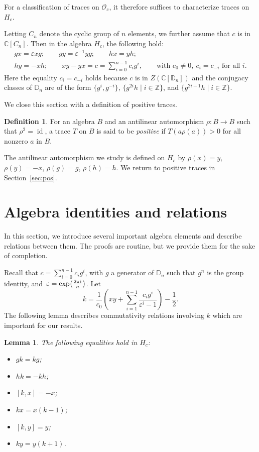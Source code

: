 \documentclass[pdftex]{sigma}
\newcommand\ZZ{\mathbb{Z}}
\newcommand\CC{\mathbb{C}}
\newcommand\DD{\mathbb{D}}
\newcommand\cO{\mathcal{O}}
\DeclareMathOperator\id{id}
\newcommand\rn{\frac{2\pi {\rm i}}{n}}
\newcommand\eps{\varepsilon}
\newcommand\half{\ensuremath{\frac{1}{2}}}
\numberwithin{equation}{section}
\newtheorem{Lemma}[Theorem]{Lemma}
\theoremstyle{definition}
\newtheorem{Definition}[Theorem]{Definition}
\begin{document}
For a classification of traces on $\cO_c$,
it therefore suffices to characterize traces on $H_c$.

Letting $C_n$ denote the cyclic group of $n$ elements,
we further assume that $c$ is in $\CC[C_n]$.
Then in the algebra $H_c$, the following hold:
\begin{gather*}
 gx = \eps xg; \qquad
 gy = \eps^{-1} yg; \qquad
 hx = yh; \\
 hy = -xh; \qquad
 xy - yx = c = \sum_{i = 0}^{n - 1} c_i g^i,\qquad
 \text{with $c_0 \neq 0$},\
 c_i = c_{-i} \text{ for all $i$}.
\end{gather*}
Here the equality $c_i = c_{-i}$ holds because
$c$ is in $Z(\CC[\DD_n])$
and the conjugacy classes of $\DD_n$ are of the form
$\big\{g^i, g^{-i}\big\}$, $\big\{ g^{2i} h \mid i \in \ZZ \big\}$,
and $\big\{ g^{2i + 1} h \mid i \in \ZZ \big\}$.

We close this section with a definition of positive traces.

\begin{Definition}
 For an algebra $B$ and an antilinear automorphism
 $\rho \colon B \to B$ such that $\rho^2 = \id$,
 a trace $T$ on $B$ is said to be \emph{positive} if
 $T(a \rho(a)) > 0$ for all nonzero $a$ in $B$.
\end{Definition}

The antilinear automorphism we study
is defined on $H_c$ by
$\rho(x) = y$, $\rho(y) = -x$, $\rho(g) = g$, $\rho(h) = h$.
We return to positive traces in Section~\ref{sec:pos}.


\section{Algebra identities and relations}
\label{sec:identities}

In this section, we introduce several important algebra elements
and describe relations between them.
The proofs are routine, but we provide them for the sake of completion.

Recall that $c = \sum_{i = 0}^{n - 1} c_i g^i$,
with $g$ a generator of $\DD_n$ such that $g^n$ is the group identity,
and~${\eps = \exp\bigl(\rn\bigr)}$.
Let
\begin{equation*}
 k = \frac1{c_0} \left( xy + \sum\limits_{i = 1}^{n - 1}
 \frac{c_i g^i}{\eps^i - 1} \right)
 - \half.
\end{equation*}
The following lemma describes commutativity relations
involving $k$
which are important for our results.

\begin{Lemma}
 \label{lem:k_prop}
 The following equalities hold in $H_c$:
 \begin{itemize}\itemsep=0pt
 \item $gk = kg$;
 \item $hk = -kh$;
 \item $[k, x] = -x$;
 \item $kx = x(k - 1)$;
 \item $[k, y] = y$;
 \item $ky = y(k + 1)$.
 \end{itemize}
\end{Lemma}
\end{document}

